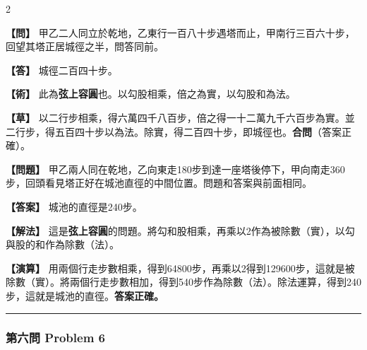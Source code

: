\documentclass[11pt,a4paper]{article}
\newcommand{\wen}[1]{\par\noindent\textbf{\color{problemcolor}【問】} #1\par}
\newcommand{\da}[1]{\par\noindent\textbf{\color{problemcolor}【答】} #1\par}
\newcommand{\shu}[1]{\par\noindent\textbf{\color{problemcolor}【術】} #1\par}
\newcommand{\cao}[1]{\par\noindent\textbf{\color{problemcolor}【草】} #1\par}
\newcommand{\wenm}[1]{\par\noindent\textbf{\color{problemcolor}【問題】} #1\par}
\newcommand{\dam}[1]{\par\noindent\textbf{\color{problemcolor}【答案】} #1\par}
\newcommand{\shum}[1]{\par\noindent\textbf{\color{problemcolor}【解法】} #1\par}
\newcommand{\caom}[1]{\par\noindent\textbf{\color{problemcolor}【演算】} #1\par}
\begin{document}
\begin{paracol}{2}
\wen{甲乙二人同立於乾地，乙東行一百八十步遇塔而止，甲南行三百六十步，回望其塔正居城徑之半，問答同前。}

\da{城徑二百四十步。}

\shu{此為\textbf{弦上容圓}也。以勾股相乘，倍之為實，以勾股和為法。}

\cao{以二行步相乘，得六萬四千八百步，倍之得一十二萬九千六百步為實。並二行步，得五百四十步以為法。除實，得二百四十步，即城徑也。\textbf{合問}（答案正確）。}

\switchcolumn
\wenm{甲乙兩人同在乾地，乙向東走180步到達一座塔後停下，甲向南走360步，回頭看見塔正好在城池直徑的中間位置。問題和答案與前面相同。}

\dam{城池的直徑是240步。}

\shum{這是\textbf{弦上容圓}的問題。將勾和股相乘，再乘以2作為被除數（實），以勾與股的和作為除數（法）。}

\caom{用兩個行走步數相乘，得到64800步，再乘以2得到129600步，這就是被除數（實）。將兩個行走步數相加，得到540步作為除數（法）。除法運算，得到240步，這就是城池的直徑。\textbf{答案正確。}}
\end{paracol}

\vspace{0.5cm}
\noindent\textcolor{rulecolor}{\rule{\textwidth}{0.4pt}}

\subsubsection*{第六問 \quad Problem 6}
\end{document}
